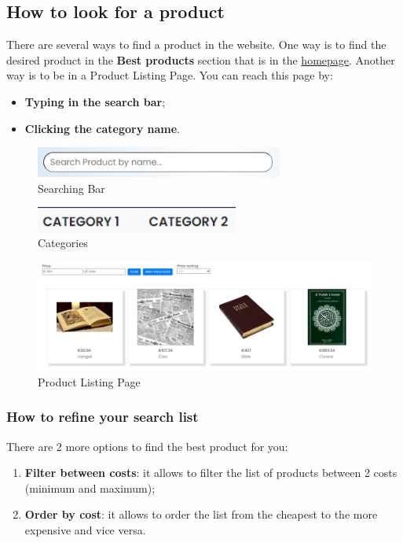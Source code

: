 \subsection{How to look for a product} \label{_lookforproduct}
There are several ways to find a product in the website. One way is to find the desired product in the \textbf{Best products} section that is in the \hyperref[_homepage]{homepage}. Another way is to be in a Product Listing Page. You can reach this page by:
\begin{itemize} 
    \item \textbf{Typing in the search bar};
    \item \textbf{Clicking the category name}.
\end{itemize}

\begin{figure}[H]
    \centering
    \includegraphics[width=22em]{res/images/cliente/searchingbar.png}
    \caption{Searching Bar}
\end{figure}

\begin{figure}[H]
    \centering
    \includegraphics[width=18em]{res/images/cliente/categories.png}
    \caption{Categories}
\end{figure}

\begin{figure}[H]
    \centering
    \includegraphics[width=\linewidth]{res/images/cliente/plp.png}
    \caption{Product Listing Page}
\end{figure}

\subsubsection{How to refine your search list}
There are 2 more options to find the best product for you:
\begin{enumerate} 
    \item \textbf{Filter between costs}: it allows to filter the list of products between 2 costs (minimum and maximum);
    \item \textbf{Order by cost}: it allows to order the list from the cheapest to the more expensive and vice versa.
\end{enumerate}

